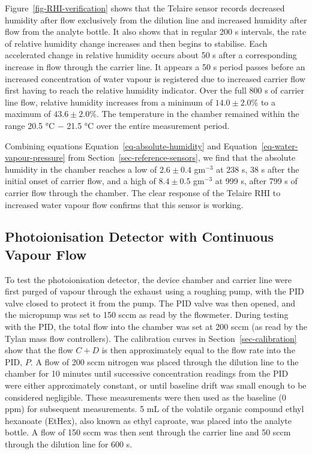 \documentclass[
  a4paper,
]{scrbook}
\begin{document}
Figure~\ref{fig-RHI-verification} shows that the Telaire sensor records
decreased humidity after flow exclusively from the dilution line and
increased humidity after flow from the analyte bottle. It also shows
that in regular 200 s intervals, the rate of relative humidity change
increases and then begins to stabilise. Each accelerated change in
relative humidity occurs about 50 s after a corresponding increase in
flow through the carrier line. It appears a 50 s period passes before an
increased concentration of water vapour is registered due to increased
carrier flow first having to reach the relative humidity indicator. Over
the full 800 s of carrier line flow, relative humidity increases from a
minimum of \(14.0 \pm 2.0\)\% to a maximum of \(43.6 \pm 2.0\)\%. The
temperature in the chamber remained within the range 20.5 °C \(-\) 21.5
°C over the entire measurement period.

Combining equations Equation~\ref{eq-absolute-humidity} and
Equation~\ref{eq-water-vapour-pressure} from
Section~\ref{sec-reference-sensors}, we find that the absolute humidity
in the chamber reaches a low of \(2.6 \pm 0.4\) gm\(^{-3}\) at 238 s, 38
s after the initial onset of carrier flow, and a high of \(8.4 \pm 0.5\)
gm\(^{-3}\) at 999 s, after 799 s of carrier flow through the chamber.
The clear response of the Telaire RHI to increased water vapour flow
confirms that this sensor is working.

\hypertarget{photoionisation-detector-with-continuous-vapour-flow}{%
\subsection{Photoionisation Detector with Continuous Vapour
Flow}\label{photoionisation-detector-with-continuous-vapour-flow}}

To test the photoionisation detector, the device chamber and carrier
line were first purged of vapour through the exhaust using a roughing
pump, with the PID valve closed to protect it from the pump. The PID
valve was then opened, and the micropump was set to 150 sccm as read by
the flowmeter. During testing with the PID, the total flow into the
chamber was set at 200 sccm (as read by the Tylan mass flow
controllers). The calibration curves in Section~\ref{sec-calibration}
show that the flow \(C + D\) is then approximately equal to the flow
rate into the PID, \(P\). A flow of 200 sccm nitrogen was placed through
the dilution line to the chamber for 10 minutes until successive
concentration readings from the PID were either approximately constant,
or until baseline drift was small enough to be considered negligible.
These measurements were then used as the baseline (0 ppm) for subsequent
measurements. 5 mL of the volatile organic compound ethyl hexanoate
(EtHex), also known as ethyl caproate, was placed into the analyte
bottle. A flow of 150 sccm was then sent through the carrier line and 50
sccm through the dilution line for 600 s.
\end{document}

